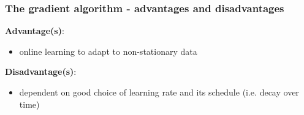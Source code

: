 \begin{frame}
\frametitle{The gradient algorithm - advantages and disadvantages}
\textbf{Advantage(s)}:
\pause
\begin{itemize}
\item online learning to adapt to non-stationary data
\end{itemize}
\textbf{Disadvantage(s)}:
\pause
\begin{itemize}
\item dependent on good choice of learning rate and its schedule (i.e. decay over time)
\end{itemize}

\end{frame}

